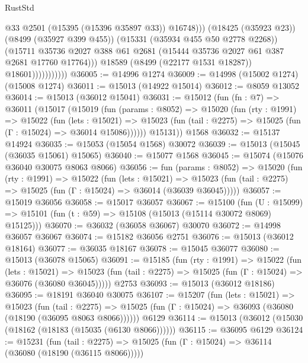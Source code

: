 \begin{lexlean}{RustStd}
\begin{coremodule}
                                  @33
                                  @2501
                                  (@15395 (@15396 @35897 @33))
                                  @16748)))
                            (@18425 (@35923 @23))
                            (@8499 (@35927 @399 @455))
                            (@15331 (@35934 @455 @50 @2778 @2268))
                            (@15711
                              @35736
                              @2027
                              @388
                              @61
                              @2681
                              (@15444 @35736 @2027 @61 @387 @2681 @17760 @17764)))
                          @18589
                          (@8499 (@22177 @1531 @18287))
                          @18601)))))))))))
@36005 := @14996 @1274
@36009 := @14998 (@15002 @1274) (@15008 @1274)
@36011 := @15013 (@14922 @15014)
@36012 := @8059 @13052
@36014 := @15013 (@36012 @15041)
@36031 := @15012
    (fun (fn : @7) =>
    @36011
      (@15017
        (@15019
          (fun (params : @8052) =>
          @15020
            (fun (rty : @1991) =>
            @15022
              (fun (lets : @15021) =>
              @15023 (fun (tail : @2275) => @15025 (fun (Γ : @15024) => @36014 @15086))))))
        @15131))
    @1568
@36032 := @15137 @14924
@36035 := @15053 (@15054 @1568) @30072
@36039 := @15013 (@15045 (@36035 @15061) @15065)
@36040 := @15077 @1568
@36045 := @15074 (@15076 @36040 @30075 @8063 @8066)
@36056 := fun (params : @8052) =>
  @15020
    (fun (rty : @1991) =>
    @15022
      (fun (lets : @15021) =>
      @15023 (fun (tail : @2275) => @15025 (fun (Γ : @15024) => @36014 (@36039 @36045)))))
@36057 := @15019 @36056
@36058 := @15017 @36057
@36067 := @15100
    (fun (U : @15099) => @15101 (fun (t : @59) => @15108 (@15013 (@15114 @30072 @8069) @15125)))
@36070 := @36032 (@36058 @36067) @30070
@36072 := @14998 @36057 @36067
@36074 := @15182 @36056 @2751
@36076 := @15013 (@36012 @18164)
@36077 := @36035 @18167
@36078 := @15045 @36077
@36080 := @15013 (@36078 @15065)
@36091 := @15185
    (fun (rty : @1991) =>
    @15022
      (fun (lets : @15021) =>
      @15023 (fun (tail : @2275) => @15025 (fun (Γ : @15024) => @36076 (@36080 @36045)))))
    @2753
@36093 := @15013 (@36012 @18186)
@36095 := @18191 @36040 @30075
@36107 := @15207
    (fun (lets : @15021) =>
    @15023
      (fun (tail : @2275) =>
      @15025 (fun (Γ : @15024) => @36093 (@36080 (@18190 (@36095 @8063 @8066))))))
    @6129
@36114 := @15013 (@36012 (@15030 (@18162 (@18183 (@15035 (@6130 @8066))))))
@36115 := @36095 @6129
@36124 := @15231
    (fun (tail : @2275) => @15025 (fun (Γ : @15024) => @36114 (@36080 (@18190 (@36115 @8066)))))

\end{coremodule}
\end{lexlean}
